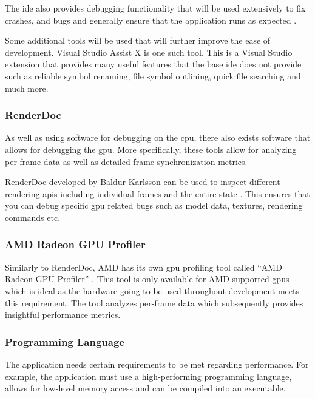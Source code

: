\documentclass[11pt]{article}
\begin{document}
The \gls*{ide} also provides debugging functionality that will be used
extensively to fix crashes, and bugs and generally ensure that the application
runs as expected \cite{visualstudio}. 

Some additional tools will be used that will further improve the ease of
development.  Visual Studio Assist X \cite{visualstudioassistx} is one such
tool. This is a Visual Studio extension that provides many useful features that
the base \gls*{ide} does not provide such as reliable symbol renaming, file symbol
outlining, quick file searching and much more.


\subsubsection{RenderDoc}
As well as using software for debugging on the \gls*{cpu}, there also exists
software that allows for debugging the \gls*{gpu}. More specifically, these tools
allow for analyzing per-frame data as well as detailed frame synchronization
metrics.

RenderDoc developed by Baldur Karlsson can be used to inspect different
rendering \glspl*{api} including individual frames and the entire state
\cite{renderdoc}. This ensures that you can debug specific \gls*{gpu} related
bugs such as model data, textures, rendering commands etc.


\subsubsection{AMD Radeon GPU Profiler}
Similarly to RenderDoc, AMD has its own \gls*{gpu} profiling tool called ``AMD
Radeon GPU Profiler'' \cite{rgp}. This tool is only available for AMD-supported
\glspl*{gpu} which is ideal as the hardware going to be used throughout
development meets this requirement. The tool analyzes per-frame data which
subsequently provides insightful performance metrics.



\subsubsection{Programming Language}
The application needs certain requirements to be met regarding performance. For
example, the application must use a high-performing programming language, allows
for low-level memory access and can be compiled into an executable.
\end{document}
